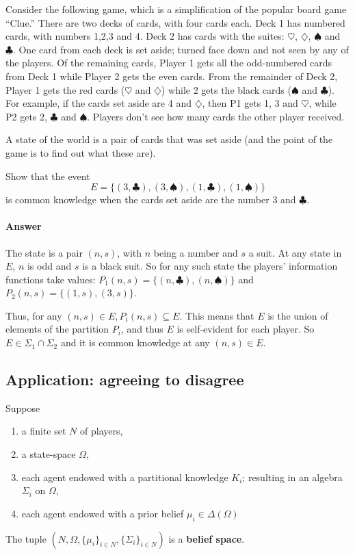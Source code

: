 \documentclass[11pt]{elegantbook}
\begin{document}
\begin{example}
    Consider the following game, which is a simplification of the popular board game “Clue.” There are two decks of cards, with four cards each. Deck 1 has numbered cards, with numbers 1,2,3 and 4. Deck 2 has cards with the suites: $\heartsuit$, $\diamondsuit$, $\spadesuit$ and $\clubsuit$. One card from each deck is set aside; turned face down and not seen by any of the players. Of the remaining cards, Player 1 gets all the odd-numbered cards from Deck 1 while Player 2 gets the even cards. From the remainder of Deck 2, Player 1 gets the red cards ($\heartsuit$ and $\diamondsuit$) while 2 gets the black cards ($\spadesuit$ and $\clubsuit$). For example, if the cards set aside are 4 and $\diamondsuit$, then P1 gets 1, 3 and $\heartsuit$, while P2 gets 2, $\clubsuit$ and $\spadesuit$. Players don't see how many cards the other player received.

    A state of the world is a pair of cards that was set aside (and the point of the game is to find out what these are).

    Show that the event
    $$E = \{(3, \clubsuit),(3, \spadesuit),(1, \clubsuit),(1, \spadesuit)\}$$ is common knowledge when the cards set aside are the number 3 and $\clubsuit$.
    \paragraph*{Answer}
    The state is a pair $(n, s)$, with $n$ being a number and $s$ a suit. At any state in $E$, $n$ is odd and $s$ is a black suit. So for any such state the players' information functions take values:
    $P_1(n, s) = \{(n, \clubsuit),(n, \spadesuit)\}$ and $P_2(n, s)= \{(1, s),(3, s)\}$.

    Thus, for any $(n, s) \in E, P_i(n, s) \subseteq E$. This means that $E$ is the union of elements of the partition $P_i$, and thus $E$ is self-evident for each player. So $E \in \Sigma_1 \cap \Sigma_2$ and it is common knowledge at any $(n, s) \in E$.
\end{example}


\subsection{Application: agreeing to disagree}
\begin{definition}
    \normalfont
    Suppose
    \begin{enumerate}
        \item a finite set $N$ of players,
        \item a state-space $\Omega$,
        \item each agent endowed with a partitional knowledge $K_i$; resulting in an algebra $\Sigma_i$ on $\Omega$,
        \item each agent endowed with a prior belief $\mu_i\in\Delta(\Omega)$
    \end{enumerate}
    The tuple $\left(N,\Omega,\{\mu_i\}_{i\in N},\{\Sigma_i\}_{i\in N}\right)$ is a \textbf{belief space}.
\end{definition}
\end{document}
